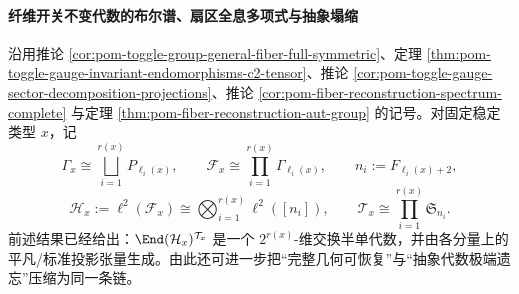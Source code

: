 \paragraph{纤维开关不变代数的布尔谱、扇区全息多项式与抽象塌缩}
沿用推论 \ref{cor:pom-toggle-group-general-fiber-full-symmetric}、定理 \ref{thm:pom-toggle-gauge-invariant-endomorphisms-c2-tensor}、推论 \ref{cor:pom-toggle-gauge-sector-decomposition-projections}、推论 \ref{cor:pom-fiber-reconstruction-spectrum-complete} 与定理 \ref{thm:pom-fiber-reconstruction-aut-group} 的记号。对固定稳定类型 \(x\)，记
\[
\Gamma_x\cong\bigsqcup_{i=1}^{r(x)}P_{\ell_i(x)},
\qquad
\mathcal F_x\cong \prod_{i=1}^{r(x)}\Gamma_{\ell_i(x)},
\qquad
n_i:=F_{\ell_i(x)+2},
\]
\[
\mathcal H_x:=\ell^2(\mathcal F_x)\cong \bigotimes_{i=1}^{r(x)}\ell^2([n_i]),
\qquad
\mathcal T_x\cong \prod_{i=1}^{r(x)}\mathfrak S_{n_i}.
\]
前述结果已经给出：\(\End(\mathcal H_x)^{\mathcal T_x}\) 是一个 \(2^{r(x)}\)-维交换半单代数，并由各分量上的平凡/标准投影张量生成。由此还可进一步把“完整几何可恢复”与“抽象代数极端遗忘”压缩为同一条链。

